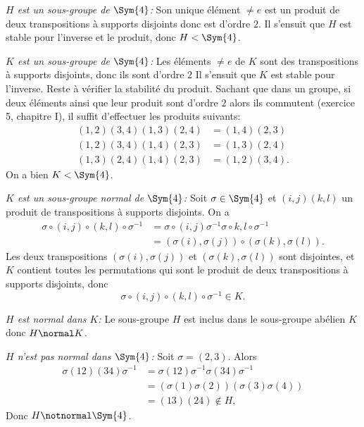 \emph{$H$ est un sous-groupe de $\Sym{4}$:} 
Son unique élément $\neq e$ est un produit de deux transpositions à supports
disjoints donc est d'ordre $2$. Il s'ensuit que $H$ est stable pour l'inverse et
le produit, donc $H<\Sym{4}$.

\emph{$K$ est un sous-groupe de $\Sym{4}$:}
Les éléments $\neq e$ de $K$ sont des transpositions à supports disjoints, donc
ils sont d'ordre $2$ Il s'ensuit que $K$ est stable pour l'inverse. Reste à
vérifier la stabilité du produit. Sachant que dans un groupe, si deux éléments
ainsi que leur produit sont d'ordre $2$ alors ils commutent (exercice 5,
chapitre I), il suffit
d'effectuer les produits suivants:
%
\begin{align*}
  (1,2)(3,4)(1,3)(2,4) &= (1,4)(2,3) \\
  (1,2)(3,4)(1,4)(2,3) &= (1,3)(2,4) \\
  (1,3)(2,4)(1,4)(2,3) &= (1,2)(3,4).
\end{align*}
%
On a bien $K<\Sym{4}$.

\emph{$K$ est un sous-groupe normal de $\Sym{4}$:}
Soit $\sigma\in\Sym{4}$ et $(i,j)(k,l)$ un produit de transpositions à supports
disjoints. On a
%
\begin{align*}
  \sigma\circ(i,j)\circ(k,l)\circ\sigma^{-1}
  &= \sigma\circ(i,j)\sigma^{-1}\sigma\circ{k,l}\circ\sigma^{-1} \\
  &= (\sigma(i),\sigma(j))\circ(\sigma(k),\sigma(l)).
\end{align*}
%
Les deux transpositions $(\sigma(i),\sigma(j))$ et $(\sigma(k),\sigma(l))$ sont
disjointes, et $K$ contient toutes les permutations qui sont le produit de deux
transpositions à supports disjoints, donc
\[
  \sigma\circ(i,j)\circ(k,l)\circ\sigma^{-1}\in K.
\]

\emph{$H$ est normal dans $K$:}
Le sous-groupe $H$ est inclus dans le sous-groupe abélien $K$ donc $H\normal K$.

\emph{$H$ n'est pas normal dans $\Sym{4}$:}
%
Soit $\sigma = (2,3)$. Alors
%
\begin{align*}
  \sigma(12)(34)\sigma^{-1} 
  &= \sigma(12)\sigma^{-1}\sigma(34)\sigma^{-1} \\
  &= (\sigma(1)\sigma(2))(\sigma(3)\sigma(4))  \\
  &= (13)(24)\notin H,
\end{align*}
%
Donc $H\notnormal\Sym{4}$.

